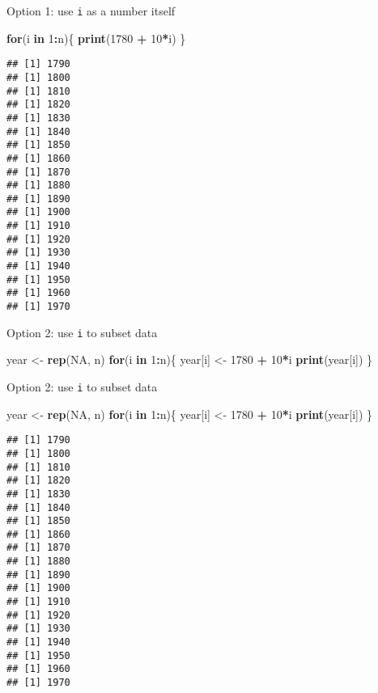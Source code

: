 \documentclass[ignorenonframetext,]{beamer}
\newenvironment{Shaded}{\begin{snugshade}}{\end{snugshade}}
\newcommand{\KeywordTok}[1]{\textcolor[rgb]{0.13,0.29,0.53}{\textbf{#1}}}
\newcommand{\DecValTok}[1]{\textcolor[rgb]{0.00,0.00,0.81}{#1}}
\newcommand{\StringTok}[1]{\textcolor[rgb]{0.31,0.60,0.02}{#1}}
\newcommand{\OtherTok}[1]{\textcolor[rgb]{0.56,0.35,0.01}{#1}}
\newcommand{\ControlFlowTok}[1]{\textcolor[rgb]{0.13,0.29,0.53}{\textbf{#1}}}
\newcommand{\OperatorTok}[1]{\textcolor[rgb]{0.81,0.36,0.00}{\textbf{#1}}}
\newcommand{\NormalTok}[1]{#1}
\begin{document}
\begin{frame}[fragile]{Option 1: use \texttt{i} as a number itself}

\begin{Shaded}
\begin{Highlighting}[]
\ControlFlowTok{for}\NormalTok{(i }\ControlFlowTok{in} \DecValTok{1}\OperatorTok{:}\NormalTok{n)\{}
  \KeywordTok{print}\NormalTok{(}\DecValTok{1780} \OperatorTok{+}\StringTok{ }\DecValTok{10}\OperatorTok{*}\NormalTok{i)}
\NormalTok{\}}
\end{Highlighting}
\end{Shaded}

\begin{verbatim}
## [1] 1790
## [1] 1800
## [1] 1810
## [1] 1820
## [1] 1830
## [1] 1840
## [1] 1850
## [1] 1860
## [1] 1870
## [1] 1880
## [1] 1890
## [1] 1900
## [1] 1910
## [1] 1920
## [1] 1930
## [1] 1940
## [1] 1950
## [1] 1960
## [1] 1970
\end{verbatim}

\end{frame}

\begin{frame}[fragile]{Option 2: use \texttt{i} to subset data}

\begin{Shaded}
\begin{Highlighting}[]
\NormalTok{year <-}\StringTok{ }\KeywordTok{rep}\NormalTok{(}\OtherTok{NA}\NormalTok{, n)}
\ControlFlowTok{for}\NormalTok{(i }\ControlFlowTok{in} \DecValTok{1}\OperatorTok{:}\NormalTok{n)\{}
\NormalTok{  year[i] <-}\StringTok{ }\DecValTok{1780} \OperatorTok{+}\StringTok{ }\DecValTok{10}\OperatorTok{*}\NormalTok{i}
  \KeywordTok{print}\NormalTok{(year[i])}
\NormalTok{\}}
\end{Highlighting}
\end{Shaded}

\end{frame}

\begin{frame}[fragile]{Option 2: use \texttt{i} to subset data}

\begin{Shaded}
\begin{Highlighting}[]
\NormalTok{year <-}\StringTok{ }\KeywordTok{rep}\NormalTok{(}\OtherTok{NA}\NormalTok{, n)}
\ControlFlowTok{for}\NormalTok{(i }\ControlFlowTok{in} \DecValTok{1}\OperatorTok{:}\NormalTok{n)\{}
\NormalTok{  year[i] <-}\StringTok{ }\DecValTok{1780} \OperatorTok{+}\StringTok{ }\DecValTok{10}\OperatorTok{*}\NormalTok{i}
  \KeywordTok{print}\NormalTok{(year[i])}
\NormalTok{\}}
\end{Highlighting}
\end{Shaded}

\begin{verbatim}
## [1] 1790
## [1] 1800
## [1] 1810
## [1] 1820
## [1] 1830
## [1] 1840
## [1] 1850
## [1] 1860
## [1] 1870
## [1] 1880
## [1] 1890
## [1] 1900
## [1] 1910
## [1] 1920
## [1] 1930
## [1] 1940
## [1] 1950
## [1] 1960
## [1] 1970
\end{verbatim}

\end{frame}
\end{document}
